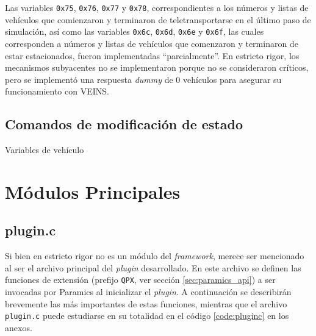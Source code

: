 \begin{description}[style=multiline]
    Las variables \texttt{0x75}, \texttt{0x76}, \texttt{0x77} y \texttt{0x78}, correspondientes a los números y listas de vehículos que comienzaron y terminaron de teletransportarse en el último paso de simulación, así como las variables \texttt{0x6c}, \texttt{0x6d}, \texttt{0x6e} y \texttt{0x6f}, las cuales corresponden a números y listas de vehículos que comenzaron y terminaron de estar estacionados, fueron implementadas ``parcialmente''. En estricto rigor, los mecanismos subyacentes no se implementaron porque no se consideraron críticos, pero se implementó una respuesta \emph{dummy} de 0 vehículos para asegurar su funcionamiento con VEINS.
    
\end{description}

\subsection{Comandos de modificación de estado}\label{sec:mod_state}

\begin{description}[style=multiline]
    \item [\texttt{0xc4}] Variables de vehículo
    \begin{multicols}{2}
        \begin{itemize}
            
        \end{itemize}
    \end{multicols}
\end{description}


\section{Módulos Principales}
\subsection{plugin.c}

Si bien en estricto rigor no es un módulo del \emph{framework}, merece ser mencionado al ser el archivo principal del \emph{plugin} desarrollado. En este archivo se definen las funciones de extensión (prefijo \texttt{QPX}, ver sección \ref{sec:paramics_api}) a ser invocadas por Paramics al inicializar el \emph{plugin}. A continuación se describirán brevemente las más importantes de estas funciones, mientras que el archivo \texttt{plugin.c} puede estudiarse en su totalidad en el código \ref{code:pluginc} en los anexos.

